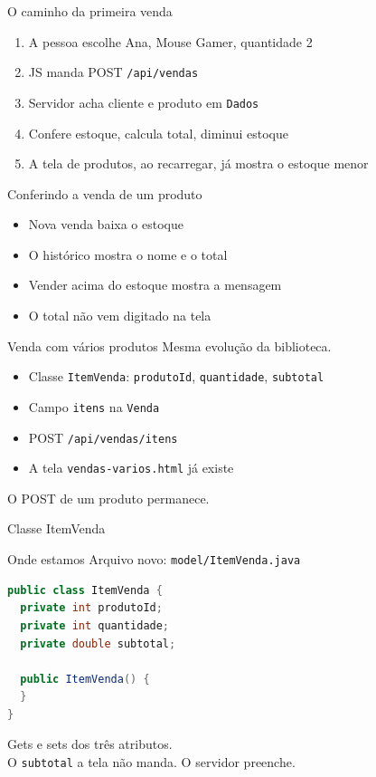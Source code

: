 \documentclass[aspectratio=169,11pt]{beamer}
\newcommand{\onde}[1]{%
  \begin{block}{Onde estamos}
    #1
  \end{block}
}
\begin{document}
\begin{frame}{O caminho da primeira venda}
  \begin{enumerate}
    \item A pessoa escolhe Ana, Mouse Gamer, quantidade 2
    \item JS manda POST \texttt{/api/vendas}
    \item Servidor acha cliente e produto em \texttt{Dados}
    \item Confere estoque, calcula total, diminui estoque
    \item A tela de produtos, ao recarregar, já mostra
          o estoque menor
  \end{enumerate}
\end{frame}

\begin{frame}{Conferindo a venda de um produto}
  \begin{itemize}
    \item [ ] Nova venda baixa o estoque
    \item [ ] O histórico mostra o nome e o total
    \item [ ] Vender acima do estoque mostra a mensagem
    \item [ ] O total não vem digitado na tela
  \end{itemize}
\end{frame}

\begin{frame}{Venda com vários produtos}
  Mesma evolução da biblioteca.

  \vspace{0.5em}
  \begin{itemize}
    \item Classe \texttt{ItemVenda}: \texttt{produtoId},
          \texttt{quantidade}, \texttt{subtotal}
    \item Campo \texttt{itens} na \texttt{Venda}
    \item POST \texttt{/api/vendas/itens}
    \item A tela \texttt{vendas-varios.html} já existe
  \end{itemize}

  \vspace{0.5em}
  O POST de um produto permanece.
\end{frame}

\begin{frame}[fragile]{Classe ItemVenda}
  \onde{Arquivo novo: \texttt{model/ItemVenda.java}}

\begin{lstlisting}[language=Java,basicstyle=\ttfamily\footnotesize]
public class ItemVenda {
  private int produtoId;
  private int quantidade;
  private double subtotal;

  public ItemVenda() {
  }
}
\end{lstlisting}

  Gets e sets dos três atributos.\\
  O \texttt{subtotal} a tela não manda. O servidor preenche.
\end{frame}
\end{document}
